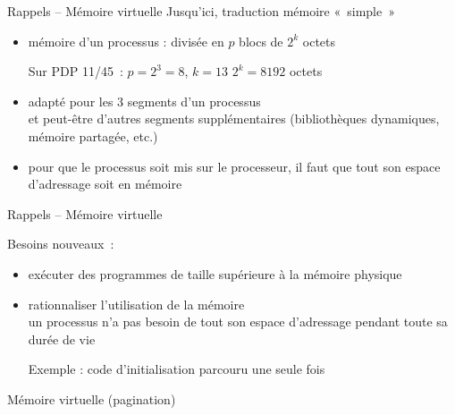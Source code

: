 \begin {frame} {Rappels -- Mémoire virtuelle}
    Jusqu'ici, traduction mémoire «~simple~»

    \begin {itemize}
	\item mémoire d'un processus : divisée en
	    $p$ blocs de $2^k$ octets

	    Sur PDP 11/45~: $p=2^3 = 8$, $k=13$ \implique $2^k = 8192$ octets

	\item adapté pour les 3 segments d'un processus \\
	    et peut-être d'autres segments supplémentaires
	    (bibliothèques dynamiques, mémoire partagée, etc.)

	\item pour que le processus soit mis sur le processeur,
	    il faut que tout son espace d'adressage soit en mémoire
    \end {itemize}

\end {frame}

\begin {frame} {Rappels -- Mémoire virtuelle}

    Besoins nouveaux~:
    \begin {itemize}
	\item exécuter des programmes de taille supérieure à la
	    mémoire physique

	\item rationnaliser l'utilisation de la mémoire \\
	    un processus n'a pas besoin de tout son espace d'adressage
	    pendant toute sa durée de vie

	    Exemple : code d'initialisation parcouru une seule
	    fois
    \end {itemize}

    \vspace* {3mm}

    \implique Mémoire virtuelle (pagination)

\end {frame}

